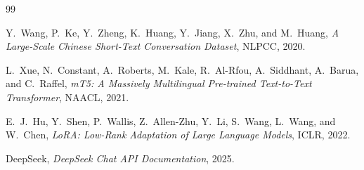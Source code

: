 \documentclass[12pt,a4paper]{article}
\begin{document}

\begin{thebibliography}{99}

Y.~Wang, P.~Ke, Y.~Zheng, K.~Huang, Y.~Jiang, X.~Zhu, and M.~Huang,
\emph{A Large-Scale Chinese Short-Text Conversation Dataset},
NLPCC, 2020.

L.~Xue, N.~Constant, A.~Roberts, M.~Kale, R.~Al-Rfou, A.~Siddhant, A.~Barua, and C.~Raffel,
\emph{mT5: A Massively Multilingual Pre-trained Text-to-Text Transformer},
NAACL, 2021.

E.~J.~Hu, Y.~Shen, P.~Wallis, Z.~Allen-Zhu, Y.~Li, S.~Wang, L.~Wang, and W.~Chen,
\emph{LoRA: Low-Rank Adaptation of Large Language Models},
ICLR, 2022.

DeepSeek,
\emph{DeepSeek Chat API Documentation},
2025.

\end{thebibliography}
\end{document}

